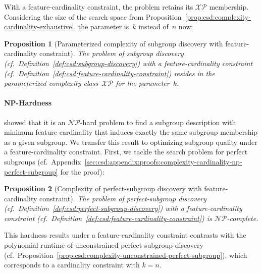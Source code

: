 \documentclass{article}
\newtheorem{proposition}{Proposition}
\theoremstyle{definition}
\begin{document}
With a feature-cardinality constraint, the problem retains its $\mathcal{XP}$ membership.
Considering the size of the search space from Proposition~\ref{prop:csd:complexity-cardinality-exhaustive}, the parameter is~$k$ instead of~$n$ now:
%
\begin{proposition}[Parameterized complexity of subgroup discovery with feature-cardinality constraint]
	The problem of subgroup discovery (cf.~Definition~\ref{def:csd:subgroup-discovery}) with a feature-cardinality constraint (cf.~Definition~\ref{def:csd:feature-cardinality-constraint}) resides in the parameterized complexity class~$\mathcal{XP}$ for the parameter~$k$.
	\label{prop:csd:complexity-cardinality-xp}
\end{proposition}

\paragraph{NP-Hardness}

\cite{boley2009non} showed that it is an $\mathcal{NP}$-hard problem to find a subgroup description with minimum feature cardinality that induces exactly the same subgroup membership as a given subgroup.
We transfer this result to optimizing subgroup quality under a feature-cardinality constraint.
First, we tackle the search problem for perfect subgroups (cf.~Appendix~\ref{sec:csd:appendix:proofs:complexity-cardinality-np-perfect-subgroup} for the proof):
%
\begin{proposition}[Complexity of perfect-subgroup discovery with feature-cardinality constraint]
	 The problem of perfect-subgroup discovery (cf.~Definition~\ref{def:csd:perfect-subgroup-discovery}) with a feature-cardinality constraint (cf.~Definition~\ref{def:csd:feature-cardinality-constraint}) is $\mathcal{NP}$-complete.
	\label{prop:csd:complexity-cardinality-np-perfect-subgroup}
\end{proposition}
%
This hardness results under a feature-cardinality constraint contrasts with the polynomial runtime of unconstrained perfect-subgroup discovery (cf.~Proposition~\ref{prop:csd:complexity-unconstrained-perfect-subgroup}), which corresponds to a cardinality constraint with $k = n$.
\end{document}
